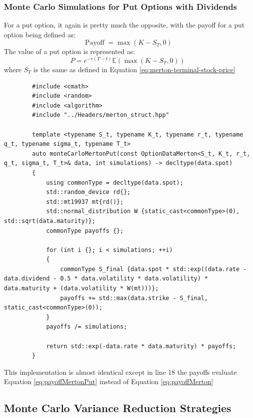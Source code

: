 \documentclass[12pt]{article}
\numberwithin{equation}{section}
\begin{document}
\subsubsection{Monte Carlo Simulations for Put Options with Dividends}
For a put option, it again is pretty much the opposite, with the payoff for a put option being defined as:
\begin{equation}
	\operatorname{Payoff} = \max(K - S_T, 0)
	\label{eq:payoffMertonPut}
\end{equation}
\newline The value of a put option is represented as: 
\begin{equation}
	P = e^{-r(T-t)} \mathbb{E}(\max(K-S_T, 0))
	\label{putMertonMC}
\end{equation}
where $S_T$ is the same as defined in Equation \ref{eq:merton-terminal-stock-price}\\
\begin{listing}[H]
	\begin{verbatim}
		#include <cmath>
		#include <random>
		#include <algorithm>
		#include "../Headers/merton_struct.hpp"
		
		template <typename S_t, typename K_t, typename r_t, typename q_t, typename sigma_t, typename T_t>
		auto monteCarloMertonPut(const OptionDataMerton<S_t, K_t, r_t, q_t, sigma_t, T_t>& data, int simulations) -> decltype(data.spot)
		{
			using commonType = decltype(data.spot);
			std::random_device rd{};
			std::mt19937 mt{rd()};
			std::normal_distribution W {static_cast<commonType>(0), std::sqrt(data.maturity)};
			commonType payoffs {};
			
			for (int i {}; i < simulations; ++i)
			{
				commonType S_final {data.spot * std::exp((data.rate - data.dividend - 0.5 * data.volatility * data.volatility) * data.maturity + (data.volatility * W(mt)))};
				payoffs += std::max(data.strike - S_final, static_cast<commonType>(0));
			}
			payoffs /= simulations;
			
			return std::exp(-data.rate * data.maturity) * payoffs;
		}
	\end{verbatim}
	\caption{Black-Scholes-Merton Put using Monte Carlo Simulations}
	\label{lst:mertonmontecarloPut}
\end{listing}
This implementation is almost identical except in line 18 the payoffs evaluate Equation \ref{eq:payoffMertonPut} instead of Equation \ref{eq:payoffMerton} 

\subsection{Monte Carlo Variance Reduction Strategies}
\end{document}
